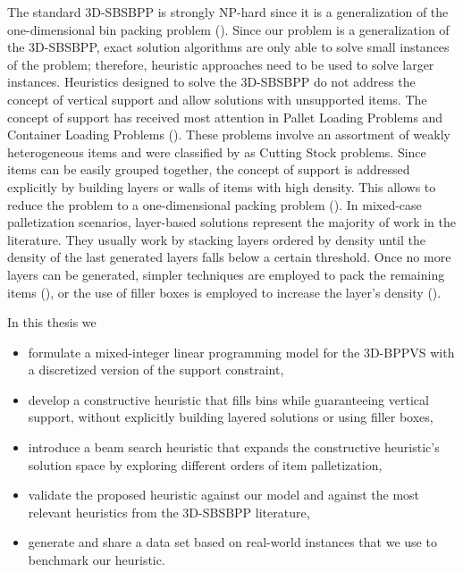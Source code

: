 The standard 3D-SBSBPP is strongly NP-hard since it is a generalization of the one-dimensional bin packing problem (\cite{martello2000three}).
Since our problem is a generalization of the 3D-SBSBPP, exact solution algorithms are only able to solve small instances of the problem; therefore, heuristic approaches need to be used to solve larger instances.
Heuristics designed to solve the 3D-SBSBPP do not address the concept of vertical support and allow solutions with unsupported items.
The concept of support has received most attention in Pallet Loading Problems and Container Loading Problems (\cite{Calzavara2021, kurpel2020exact}).
These problems involve an assortment of weakly heterogeneous items and were classified by \cite{WASCHER20071109} as Cutting Stock problems.
Since items can be easily grouped together, the concept of support is addressed explicitly by building layers or walls of items with high density. This allows to reduce the problem to a one-dimensional packing problem (\cite{BORTFELDT20131}).
In mixed-case palletization scenarios, layer-based solutions represent the majority of work in the literature. They usually work by stacking layers ordered by density until the density of the last generated layers falls below a certain threshold.
Once no more layers can be generated, simpler techniques are employed to pack the remaining items (\cite{elhedhli2019three}), or the use of filler boxes is employed to increase the layer's density (\cite{Calzavara2021}).

In this thesis we
\begin{itemize}
    \item formulate a mixed-integer linear programming model for the 3D-BPPVS with a discretized version of the support constraint,
    \item develop a constructive heuristic that fills bins while guaranteeing vertical support, without explicitly building layered solutions or using filler boxes,
    \item introduce a beam search heuristic that expands the constructive heuristic's solution space by exploring different orders of item palletization,
    \item validate the proposed heuristic against our model and against the most relevant heuristics from the 3D-SBSBPP literature,
    \item generate and share a data set based on real-world instances that we use to benchmark our heuristic.
\end{itemize}

